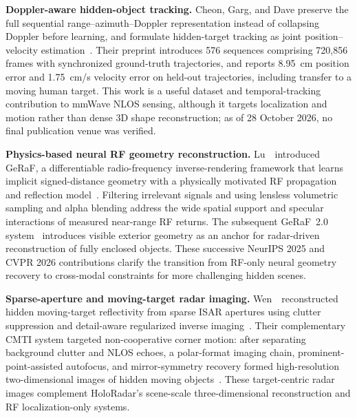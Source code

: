 \vspace{0.8mm}
\noindent \textbf{Doppler-aware hidden-object tracking.}
Cheon, Garg, and Dave preserve the full sequential range--azimuth--Doppler representation instead of collapsing Doppler before learning, and formulate hidden-target tracking as joint position--velocity estimation~\cite{cheonDopplerPositionVelocityNLOS2026}. Their preprint introduces 576 sequences comprising 720,856 frames with synchronized ground-truth trajectories, and reports 8.95~cm position error and 1.75~cm/s velocity error on held-out trajectories, including transfer to a moving human target. This work is a useful dataset and temporal-tracking contribution to mmWave NLOS sensing, although it targets localization and motion rather than dense 3D shape reconstruction; as of 28 October 2026, no final publication venue was verified.


\vspace{0.8mm}
\noindent \textbf{Physics-based neural RF geometry reconstruction.}
Lu~\etal~introduced GeRaF, a differentiable radio-frequency inverse-rendering framework that learns implicit signed-distance geometry with a physically motivated RF propagation and reflection model~\cite{luGeRaF2025}. Filtering irrelevant signals and using lensless volumetric sampling and alpha blending address the wide spatial support and specular interactions of measured near-range RF returns. The subsequent GeRaF~2.0 system~\cite{luSeeingThroughBoxes2026} introduces visible exterior geometry as an anchor for radar-driven reconstruction of fully enclosed objects. These successive NeurIPS 2025 and CVPR 2026 contributions clarify the transition from RF-only neural geometry recovery to cross-modal constraints for more challenging hidden scenes.

\vspace{0.8mm}
\noindent \textbf{Sparse-aperture and moving-target radar imaging.}
Wen~\etal~reconstructed hidden moving-target reflectivity from sparse ISAR apertures using clutter suppression and detail-aware regularized inverse imaging~\cite{wenSparseApertureISARNLOS2024}. Their complementary CMTI system targeted non-cooperative corner motion: after separating background clutter and NLOS echoes, a polar-format imaging chain, prominent-point-assisted autofocus, and mirror-symmetry recovery formed high-resolution two-dimensional images of hidden moving objects~\cite{wenCMTICornerMotion2025}. These target-centric radar images complement HoloRadar's scene-scale three-dimensional reconstruction and RF localization-only systems.

